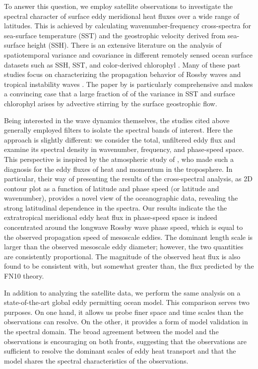 \documentclass[10pt]{article}
\begin{document}
To answer this question, we employ satellite observations to investigate the spectral character of surface eddy meridional heat fluxes over a wide range of latitudes. This is achieved by calculating wavenumber-frequency cross-spectra for sea-surface temperature (SST) and the geostrophic velocity derived from sea-surface height (SSH). There is an extensive literature on the analysis of spatiotemporal variance and covariance in different remotely sensed ocean surface datasets such as SSH, SST, and color-derived chlorophyl \citep[see review by][]{OBrienEtAl2013}. Many of these past studies focus on characterizing the propagation behavior of Rossby waves \citep{CheltonSchalx1996,PolitoCornillon1997,CipolliniEtAl1997,HillEtAl2000,CipolliniEtAl2001,PolitoLiu2003,KillworthEtAl2004} and tropical instability waves \citep{PolitoEtAl2001,Contreras2002,CheltonEtAl2000,LeeEtAl2012}. The paper by \citet{KillworthEtAl2004} is particularly comprehensive and makes a convincing case that a large fraction of of the variance in SST and surface chlorophyl arises by advective stirring by the surface geostrophic flow.

Being interested in the wave dynamics themselves, the studies cited above generally employed filters to isolate the spectral bands of interest. Here the approach is slightly different: we consider the total, unfiltered eddy flux and examine its spectral density in wavenumber, frequency, and phase-speed space. This perspective is inspired by the atmospheric study of \citet[][henceforth RH91]{RandelHeld1991}, who made such a diagnosis for the eddy fluxes of heat and momentum in the troposphere. In particular, their way of presenting the results of the cross-spectral analysis, as 2D contour plot as a function of latitude and phase speed (or latitude and wavenumber), provides a novel view of the oceanographic data, revealing the strong latitudinal dependence in the spectra. Our results indicate the the extratropical meridional eddy heat flux in phase-speed space is indeed concentrated around the longwave Rossby wave phase speed, which is equal to the observed propagation speed of mesoscale eddies. The dominant length scale is larger than the observed mesoscale eddy diameter; however, the two quantities are consistently proportional. The magnitude of the observed heat flux is also found to be consistent with, but somewhat greater than, the flux predicted by the FN10 theory.

In addition to analyzing the satellite data, we perform the same analysis on a state-of-the-art global eddy permitting ocean model. This comparison serves two purposes. On one hand, it allows us probe finer space and time scales than the observations can resolve. On the other, it provides a form of model validation in the spectral domain. The broad agreement between the model and the observations is encouraging on both fronts, suggesting that the observations are sufficient to resolve the dominant scales of eddy heat transport and that the model shares the spectral characteristics of the observations.
\end{document}
